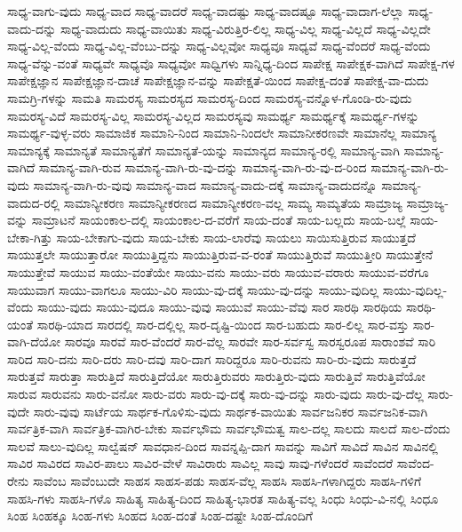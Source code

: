 {ಸಾಧ್ಯ-ವಾಗು-ವುದು
ಸಾಧ್ಯ-ವಾದ
ಸಾಧ್ಯ-ವಾದರೆ
ಸಾಧ್ಯ-ವಾದಷ್ಟು
ಸಾಧ್ಯ-ವಾದಷ್ಟೂ
ಸಾಧ್ಯ-ವಾದಾಗ-ಲೆಲ್ಲಾ
ಸಾಧ್ಯ-ವಾದು-ದನ್ನು
ಸಾಧ್ಯ-ವಾದುದು
ಸಾಧ್ಯ-ವಾಯಿತು
ಸಾಧ್ಯ-ವಿರುತ್ತಿರ-ಲಿಲ್ಲ
ಸಾಧ್ಯ-ವಿಲ್ಲ
ಸಾಧ್ಯ-ವಿಲ್ಲದೆ
ಸಾಧ್ಯ-ವಿಲ್ಲದೇ
ಸಾಧ್ಯ-ವಿಲ್ಲ-ವೆಂದು
ಸಾಧ್ಯ-ವಿಲ್ಲ-ವೆಂಬು-ದನ್ನು
ಸಾಧ್ಯ-ವಿಲ್ಲವೋ
ಸಾಧ್ಯವೂ
ಸಾಧ್ಯವೆ
ಸಾಧ್ಯ-ವೆಂದರೆ
ಸಾಧ್ಯ-ವೆಂದು
ಸಾಧ್ಯ-ವೆನ್ನು-ವಂತೆ
ಸಾಧ್ಯವೇ
ಸಾಧ್ಯವೊ
ಸಾಧ್ಯವೋ
ಸಾಧ್ವಿಗಳು
ಸಾನ್ನಿಧ್ಯ-ದಿಂದ
ಸಾಪೇಕ್ಷ
ಸಾಪೇಕ್ಷಕ-ವಾಗಿದೆ
ಸಾಪೇಕ್ಷ-ಗಳ
ಸಾಪೇಕ್ಷಜ್ಞಾನ
ಸಾಪೇಕ್ಷಜ್ಞಾನ-ದಾಚೆ
ಸಾಪೇಕ್ಷಜ್ಞಾನ-ವನ್ನು
ಸಾಪೇಕ್ಷತೆ-ಯಿಂದ
ಸಾಪೇಕ್ಷ-ದಂತೆ
ಸಾಪೇಕ್ಷ-ವಾ-ದುದು
ಸಾಮಗ್ರಿ-ಗಳನ್ನು
ಸಾಮತಿ
ಸಾಮರಸ್ಯ
ಸಾಮರಸ್ಯದ
ಸಾಮರಸ್ಯ-ದಿಂದ
ಸಾಮರಸ್ಯ-ವನ್ನೊಳ-ಗೊಂಡಿ-ರು-ವುದು
ಸಾಮರಸ್ಯ-ವಿದೆ
ಸಾಮರಸ್ಯ-ವಿಲ್ಲ
ಸಾಮರಸ್ಯ-ವಿಲ್ಲದ
ಸಾಮರಸ್ಯವು
ಸಾಮರ್ಥ್ಯ
ಸಾಮರ್ಥ್ಯಕ್ಕೆ
ಸಾಮರ್ಥ್ಯ-ಗಳನ್ನು
ಸಾಮರ್ಥ್ಯ-ವುಳ್ಳ-ವರು
ಸಾಮಾಜಿಕ
ಸಾಮಾನಿ-ನಿಂದ
ಸಾಮಾನಿ-ನಿಂದಲೇ
ಸಾಮಾನೀಕರಣವೇ
ಸಾಮಾನೆಲ್ಲ
ಸಾಮಾನ್ಯ
ಸಾಮಾನ್ಯಕ್ಕೆ
ಸಾಮಾನ್ಯತೆ
ಸಾಮಾನ್ಯತೆಗೆ
ಸಾಮಾನ್ಯತೆ-ಯನ್ನು
ಸಾಮಾನ್ಯದ
ಸಾಮಾನ್ಯ-ರಲ್ಲಿ
ಸಾಮಾನ್ಯ-ವಾಗಿ
ಸಾಮಾನ್ಯ-ವಾಗಿದೆ
ಸಾಮಾನ್ಯ-ವಾಗಿ-ರುವ
ಸಾಮಾನ್ಯ-ವಾಗಿ-ರು-ವು-ದನ್ನು
ಸಾಮಾನ್ಯ-ವಾಗಿ-ರು-ವು-ದ-ರಿಂದ
ಸಾಮಾನ್ಯ-ವಾಗಿ-ರು-ವುದು
ಸಾಮಾನ್ಯ-ವಾಗಿ-ರು-ವುವು
ಸಾಮಾನ್ಯ-ವಾದ
ಸಾಮಾನ್ಯ-ವಾದು-ದಕ್ಕೆ
ಸಾಮಾನ್ಯ-ವಾದುದನ್ನೊ
ಸಾಮಾನ್ಯ-ವಾದುದ-ರಲ್ಲಿ
ಸಾಮಾನ್ಯೀಕರಣ
ಸಾಮಾನ್ಯೀಕರಣದ
ಸಾಮಾನ್ಯೀಕರಣ-ವಲ್ಲ
ಸಾಮ್ಯ
ಸಾಮ್ಯತೆಯ
ಸಾಮ್ರಾಜ್ಯ
ಸಾಮ್ರಾಜ್ಯ-ವನ್ನು
ಸಾಮ್ರಾಟನೆ
ಸಾಯಂಕಾಲ-ದಲ್ಲಿ
ಸಾಯಂಕಾಲ-ದ-ವರೆಗೆ
ಸಾಯ-ದಂತೆ
ಸಾಯ-ಬಲ್ಲದು
ಸಾಯ-ಬಲ್ಲೆ
ಸಾಯ-ಬೇಕಾ-ಗಿತ್ತು
ಸಾಯ-ಬೇಕಾಗು-ವುದು
ಸಾಯ-ಬೇಕು
ಸಾಯ-ಲಾರೆವು
ಸಾಯಲು
ಸಾಯಿಸುತ್ತಿರುವ
ಸಾಯುತ್ತದೆ
ಸಾಯುತ್ತಲೇ
ಸಾಯುತ್ತಾರೋ
ಸಾಯುತ್ತಿದ್ದನು
ಸಾಯುತ್ತಿರುವ-ವ-ರಂತೆ
ಸಾಯುತ್ತಿರುವೆ
ಸಾಯುತ್ತೀರಿ
ಸಾಯುತ್ತೇನೆ
ಸಾಯುತ್ತೇವೆ
ಸಾಯುವ
ಸಾಯು-ವಂತೆಯೇ
ಸಾಯು-ವನು
ಸಾಯು-ವರು
ಸಾಯುವ-ವರಾರು
ಸಾಯುವ-ವರೆಗೂ
ಸಾಯುವಾಗ
ಸಾಯು-ವಾಗಲೂ
ಸಾಯು-ವಿರಿ
ಸಾಯು-ವು-ದಕ್ಕೆ
ಸಾಯು-ವು-ದನ್ನು
ಸಾಯು-ವುದಿಲ್ಲ
ಸಾಯು-ವುದಿಲ್ಲ-ವೆಂದು
ಸಾಯು-ವುದು
ಸಾಯು-ವುದೂ
ಸಾಯು-ವುವು
ಸಾಯುವೆ
ಸಾಯು-ವೆವು
ಸಾರ
ಸಾರಥಿ
ಸಾರಥಿಯ
ಸಾರಥಿ-ಯಂತೆ
ಸಾರಥಿ-ಯಾದ
ಸಾರದಲ್ಲಿ
ಸಾರ-ದಲ್ಲಿಲ್ಲ
ಸಾರ-ದೃಷ್ಟಿ-ಯಿಂದ
ಸಾರ-ಬಹುದು
ಸಾರ-ಲಿಲ್ಲ
ಸಾರ-ವಸ್ತು
ಸಾರ-ವಾಗಿ-ದೆಯೋ
ಸಾರವೂ
ಸಾರವೆ
ಸಾರ-ವೆಂದರೆ
ಸಾರ-ವೆಲ್ಲ
ಸಾರವೇ
ಸಾರ-ಸರ್ವಸ್ವ
ಸಾರಸ್ವರೂಪ
ಸಾರಾಂಶವೆ
ಸಾರಿ
ಸಾರಿದ
ಸಾರಿ-ದನು
ಸಾರಿ-ದರು
ಸಾರಿ-ದವು
ಸಾರಿ-ದಾಗ
ಸಾರಿದ್ದರೂ
ಸಾರಿ-ರುವನು
ಸಾರಿ-ರು-ವುದು
ಸಾರುತ್ತದೆ
ಸಾರುತ್ತವೆ
ಸಾರುತ್ತಾ
ಸಾರುತ್ತಿದೆ
ಸಾರುತ್ತಿದೆಯೋ
ಸಾರುತ್ತಿರುವರು
ಸಾರುತ್ತಿರು-ವುದು
ಸಾರುತ್ತಿವೆ
ಸಾರುತ್ತಿವೆಯೋ
ಸಾರುವ
ಸಾರುವನು
ಸಾರು-ವನೋ
ಸಾರು-ವರು
ಸಾರು-ವು-ದಕ್ಕೆ
ಸಾರು-ವು-ದನ್ನು
ಸಾರು-ವುದು
ಸಾರು-ವು-ದೆಲ್ಲ
ಸಾರು-ವುದೇ
ಸಾರು-ವುವು
ಸಾರ್ಟೆಯ
ಸಾರ್ಥಕ-ಗೊಳಿಸು-ವುದು
ಸಾರ್ಥಕ-ವಾಯಿತು
ಸಾರ್ವಜನಿಕರ
ಸಾರ್ವಜನಿಕ-ವಾಗಿ
ಸಾರ್ವತ್ರಿಕ-ವಾಗಿ
ಸಾರ್ವತ್ರಿಕ-ವಾಗಿರ-ಬೇಕು
ಸಾರ್ವಭೌಮ
ಸಾರ್ವಭೌಮತ್ವ
ಸಾಲ-ದಲ್ಲ
ಸಾಲದು
ಸಾಲದೆ
ಸಾಲ-ದೆಂದು
ಸಾಲವೆ
ಸಾಲು-ವುದಿಲ್ಲ
ಸಾಲ್ವೆಷನ್
ಸಾವಧಾನ-ದಿಂದ
ಸಾವನ್ನಪ್ಪಿ-ದಾಗ
ಸಾವನ್ನು
ಸಾವಿಗೆ
ಸಾವಿದೆ
ಸಾವಿನ
ಸಾವಿನಲ್ಲಿ
ಸಾವಿರ
ಸಾವಿರದ
ಸಾವಿರ-ಪಾಲು
ಸಾವಿರ-ವೇಳೆ
ಸಾವಿರಾರು
ಸಾವಿಲ್ಲ
ಸಾವು
ಸಾವು-ಗಳೆಂದರೆ
ಸಾವೆಂದರೆ
ಸಾವೆಂದ-ರೇನು
ಸಾವೆಂಬ
ಸಾವೆಂಬುದೇ
ಸಾಹಸ
ಸಾಹಸ-ಪಡು
ಸಾಹಸ-ವೆಲ್ಲ
ಸಾಹಸಿ
ಸಾಹಸಿ-ಗಳಾಗಿದ್ದರು
ಸಾಹಸಿ-ಗಳಿಗೆ
ಸಾಹಸಿ-ಗಳು
ಸಾಹಸಿ-ಗಳೊ
ಸಾಹಿತ್ಯ
ಸಾಹಿತ್ಯ-ದಿಂದ
ಸಾಹಿತ್ಯ-ಭಾರತ
ಸಾಹಿತ್ಯ-ವಲ್ಲ
ಸಿಂಧು
ಸಿಂಧು-ವಿ-ನಲ್ಲಿ
ಸಿಂಧೂ
ಸಿಂಹ
ಸಿಂಹಕ್ಕೂ
ಸಿಂಹ-ಗಳು
ಸಿಂಹದ
ಸಿಂಹ-ದಂತೆ
ಸಿಂಹ-ದಷ್ಟೇ
ಸಿಂಹ-ದೊಂದಿಗೆ
}
